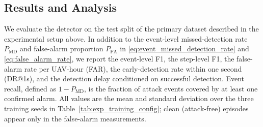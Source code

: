 
\subsection{Results and Analysis}
\label{sec:results}

We evaluate the detector on the test split of the primary dataset described
in the experimental setup above. In addition to the event-level
missed-detection rate $P_{\mathrm{MD}}$ and false-alarm proportion
$P_{\mathrm{FA}}$ in \eqref{eq:event_missed_detection_rate} and
\eqref{eq:false_alarm_rate}, we report the event-level F1, the step-level
F1, the false-alarm rate per UAV-hour (FAR), the early-detection rate within
one second (DR@1s), and the detection delay conditioned on successful
detection. Event recall, defined as $1-P_{\mathrm{MD}}$, is the fraction of
attack events covered by at least one confirmed alarm. All values are the
mean and standard deviation over the three training seeds in
Table~\ref{tab:exp_training_config}; clean (attack-free) episodes appear
only in the false-alarm measurements.

